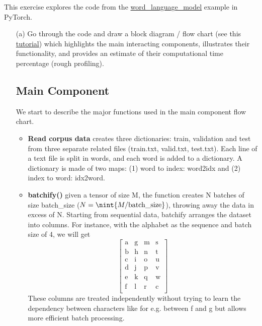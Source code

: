 \documentclass[11pt]{article}
\DeclarePairedDelimiter{\nint}\lfloor\rceil
\newcommand{\0}{\mat{0}}
\begin{document}
 This exercise explores the code from the \href{https://github.com/pytorch/examples/tree/master/word_language_model}{word\_language\_model} example in PyTorch.
 \begin{itemize}
   \item[(a)]   
   Go through the code and draw a block diagram / flow chart (see this \href{https://www.sharelatex.com/blog/2013/08/29/tikz-series-pt3.html} {tutorial}) which highlights the main interacting components, illustrates their functionality, and provides an estimate of their computational time percentage (rough profiling).
   
   \subsection*{Main Component}
   We start to describe the  major functions used in the main component flow chart.
   \begin{itemize}
   	\item \textbf{Read corpus data} creates three dictionaries: train, validation and test from three separate related files (train.txt, valid.txt, test.txt). Each line of a text file is split in words, and each word
	is added to a dictionary. A dictionary is made of two maps: (1) word to index: word2idx and (2) index to word: idx2word.
	\item \textbf{batchify()} given a tensor of size M, the function creates N batches of size batch\_size ($N=\nint{M/\text{batch\_size}}$), throwing away the data in excess of N. 
	Starting from sequential data, batchify arranges the dataset into columns. For instance, with the alphabet as the sequence and batch size of 4, we will get
	\[
			\begin{bmatrix}
   				\text{a} &  \text{g} & \text{m} & \text{s}  \\
   				\text{b}  &  \text{h} & \text{n} & \text{t} \\
   				\text{c}  &  \text{i} & \text{o} & \text{u} \\
   				\text{d}  &  \text{j} & \text{p} & \text{v} \\
   				\text{e}  &  \text{k} & \text{q} & \text{w} \\
   				\text{f}  &  \text{l} & \text{r} & \text{c} \\
			\end{bmatrix}
	\]	
	These columns are treated independently without trying to learn the dependency between characters like for e.g. between f and g but allows  more efficient batch processing.


\end{itemize}
\end{itemize}
\end{document}

